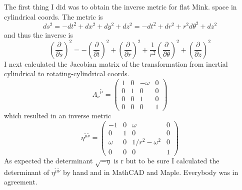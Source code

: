 The first thing I did was to obtain the inverse metric for flat Mink. space
in cylindrical coords.
The metric is 
\[
ds^2 = -dt^2 + dx^2 + dy^2 + dz ^2 = -dt^2 + dr^2 + r^2 d {\theta}^2 + dz^2
\] 
and thus the inverse is
\[
\left( \frac{\partial}{\partial s} \right) ^2 = 
   - \left( \frac{\partial}{\partial t} \right) ^2
   + \left( \frac{\partial}{\partial r} \right) ^2
   + \frac{1}{r^2}\left( \frac{\partial}{\partial \theta} \right) ^2
   + \left( \frac{\partial}{\partial z} \right) ^2          
\]
I next calculated the Jacobian matrix of the transformation from inertial
cylindrical to rotating-cylindrical coords.
\[
{\Lambda _{\nu}}^{\tilde \mu} = \left( \begin{array}{cccc}
                                     1 & 0 & - \omega & 0 \\
						             0 & 1 &    0     & 0 \\
								     0 & 0 &    1     & 0 \\
								     0 & 0 &    0     & 1 
							        \end{array} \right)
\]
which resulted in an inverse metric 
\[
{\eta}^{\tilde \mu \tilde \nu}= \left( \begin{array}{cccc}
                                     -1     & 0 & \omega            & 0 \\
						             0      & 1 &    0              & 0 \\
								     \omega & 0 &  1/r^2 - \omega^2 & 0 \\
								     0      & 0 &    0              & 1 
							        \end{array} \right)
\]
As expected the determinant $\sqrt{-\eta}$ is r but to be sure I calculated 
the determinant of ${\eta}^{\tilde \mu \tilde \nu}$ by hand and in MathCAD and Maple.
Everybody was in agreement.

